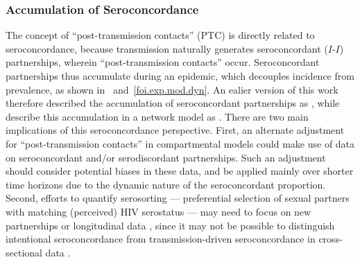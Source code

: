 \subsubsection{Accumulation of Seroconcordance}
The concept of ``post-transmission contacts'' (PTC) is directly related to seroconcordance,
because transmission naturally generates seroconcordant ($I$-$I$) partnerships,
wherein ``post-transmission contacts'' occur.
Seroconcordant partnerships thus accumulate during an epidemic,
which decouples incidence from prevalence,
as shown in ~and~\ref{foi.exp.mod.dyn}.
An ealier version of this work \cite{Knight2022smdm} therefore
described the accumulation of seroconcordant partnerships as
, while
\citet{Eames2002} describe this accumulation in a network model as
.
There are two main implications of this seroconcordance perspective.
First, an alternate adjustment for ``post-transmission contacts'' in compartmental models
could make use of data on seroconcordant and/or serodiscordant partnerships.
Such an adjustment should consider potential biases in these data, and
be applied mainly over shorter time horizons
due to the dynamic nature of the seroconcordant proportion.
Second, efforts to quantify serosorting --- preferential selection of sexual partners
with matching (perceived) HIV serostatus \cite{Cassels2013} ---
may need to focus on new partnerships or longitudinal data \cite{Kim2020},
since it may not be possible to distinguish intentional seroconcordance
from transmission-driven seroconcordance in cross-sectional data \cite{Cassels2009,Wang2020}.
